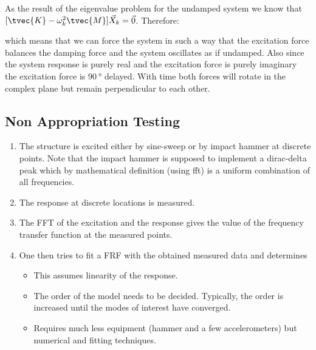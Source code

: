 \documentclass[10pt,a4paper]{scrartcl}
\begin{document}
\begin{multicols*}{2}

As the result of the eigenvalue problem for the undamped system we know that ${[\tvec{K}-\omega_k^2\tvec{M}]\vec{X}_k=\vec{0}}$. Therefore:


which means that we can force the system in such a way that the excitation force balances the damping force and the system oscillates as if undamped. Also since the system response is purely real and the excitation force is purely imaginary the excitation force is $\SI{90}{\degree}$ delayed. With time both forces will rotate in the complex plane but remain perpendicular to each other.


\subsection{Non Appropriation Testing}

\begin{enumerate}
\item The structure is excited either by sine-sweep or by impact hammer at discrete points. Note that the impact hammer is supposed to implement a dirac-delta peak which by mathematical definition (using fft) is a uniform combination of all frequencies.
\item The response at discrete locations is measured.
\item The FFT of the excitation and the response gives the value of the frequency transfer function at the measured points.
\item One then tries to fit a FRF with the obtained measured data and determines



\begin{itemize}
\item This assumes linearity of the response.
\item The order of the model needs to be decided. Typically, the order is increased until the modes of interest have converged.
\item Requires much less equipment (hammer and a few accelerometers) but numerical and fitting techniques.
\end{itemize}
\end{enumerate}

\end{multicols*}
\end{document}
